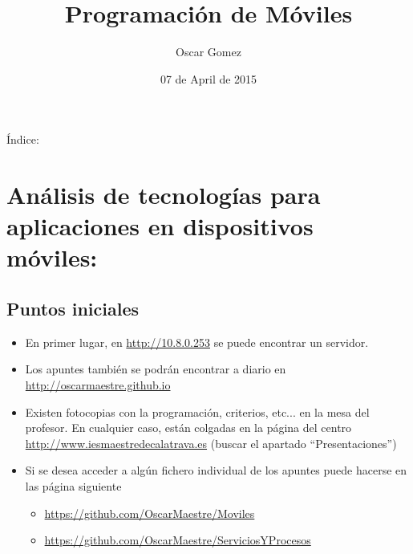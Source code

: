 \documentclass[a4paper,12pt,spanish]{sphinxmanual}
\title{Programación de Móviles}
\date{07 de April de 2015}
\author{Oscar Gomez}
\begin{document}
\maketitle
\tableofcontents
{}\label{index::doc}


Índice:


\chapter{Análisis de tecnologías para aplicaciones en dispositivos móviles:}
\label{tema1::doc}\label{tema1:prog-multimedia-y-de-dispositivos-moviles}\label{tema1:analisis-de-tecnologias-para-aplicaciones-en-dispositivos-moviles}

\section{Puntos iniciales}
\label{tema1:puntos-iniciales}\begin{itemize}
\item {} 
En primer lugar, en \href{http://10.8.0.253}{http://10.8.0.253} se puede encontrar un servidor.

\item {} 
Los apuntes también se podrán encontrar a diario en \href{http://oscarmaestre.github.io}{http://oscarmaestre.github.io}

\item {} 
Existen fotocopias con la programación, criterios, etc... en la mesa del profesor. En cualquier caso, están colgadas en la página del centro \href{http://www.iesmaestredecalatrava.es}{http://www.iesmaestredecalatrava.es} (buscar el apartado ``Presentaciones'')

\item {} 
Si se desea acceder a algún fichero individual de los apuntes puede hacerse en las página siguiente
\begin{itemize}
\item {} 
\href{https://github.com/OscarMaestre/Moviles}{https://github.com/OscarMaestre/Moviles}

\item {} 
\href{https://github.com/OscarMaestre/ServiciosYProcesos}{https://github.com/OscarMaestre/ServiciosYProcesos}

\end{itemize}

\end{itemize}
\end{document}
